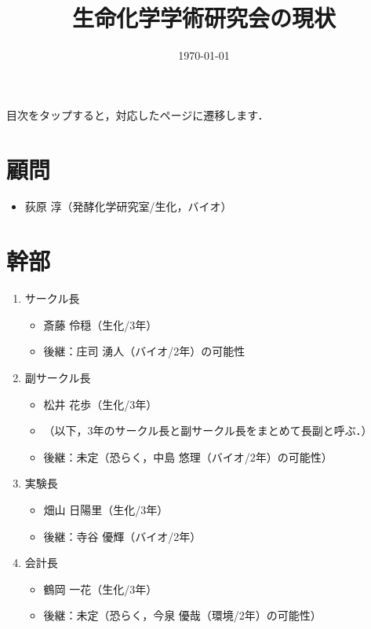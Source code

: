 \documentclass[a4paper,11pt]{ltjsarticle}
\title{生命化学学術研究会の現状}
\author{\today}
\date{}
\begin{document}
\pagestyle{fancy}
\rhead{}
\cfoot{\thepage}

\maketitle

\tableofcontents

\hspace*{12pt}

目次をタップすると，対応したページに遷移します．

\clearpage

\section{顧問}
\begin{itemize}
    \item 荻原 淳（発酵化学研究室/生化，バイオ）
\end{itemize}

\section{幹部}

\begin{enumerate}
    \item サークル長
    \begin{itemize}
        \item 斎藤 伶穏（生化/3年）
        \item 後継：庄司 湧人（バイオ/2年）の可能性
    \end{itemize}
    \item 副サークル長
    \begin{itemize}
        \item 松井 花歩（生化/3年）
        \item （以下，3年のサークル長と副サークル長をまとめて長副と呼ぶ．）
        \item 後継：未定（恐らく，中島 悠理（バイオ/2年）の可能性）
    \end{itemize}
    \item 実験長
    \begin{itemize}
        \item 畑山 日陽里（生化/3年）
        \item 後継：寺谷 優輝（バイオ/2年）
    \end{itemize}
    \item 会計長
    \begin{itemize}
        \item 鶴岡 一花（生化/3年）
        \item 後継：未定（恐らく，今泉 優哉（環境/2年）の可能性）
    \end{itemize}
\end{enumerate}
\end{document}
